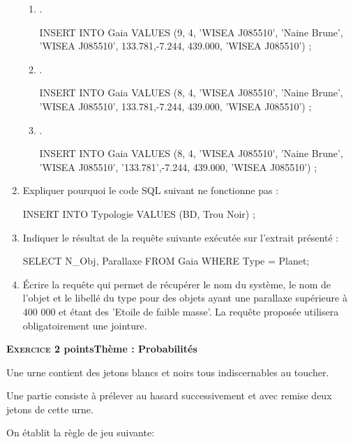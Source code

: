 \documentclass[12pt]{book}
\begin{document}
\begin{enumerate}
\begin{enumerate}
\item .\\
\begin{sql}
INSERT INTO Gaia VALUES (9, 4, 'WISEA J085510', 'Naine Brune', 'WISEA J085510', 133.781,-7.244, 439.000, 'WISEA J085510') ;
\end{sql} 

\item .\\
\begin{sql}
INSERT INTO Gaia VALUES (8, 4, 'WISEA J085510', 'Naine Brune', 'WISEA J085510', 133.781,-7.244, 439.000, 'WISEA J085510') ; 
\end{sql}

\item .\\
\begin{sql}
INSERT INTO Gaia VALUES (8, 4, 'WISEA J085510', 'Naine Brune', 'WISEA J085510', '133.781',-7.244, 439.000, 'WISEA J085510') ;
\end{sql}

	\end{enumerate}
\item Expliquer pourquoi le code SQL suivant ne fonctionne pas : 
\begin{sql}
INSERT INTO Typologie VALUES (BD, Trou Noir) ;
\end{sql}
\item Indiquer le résultat de la requête suivante exécutée sur l’extrait présenté : 
\begin{sql}
SELECT N_Obj, Parallaxe 
FROM Gaia 
WHERE Type = Planet;
\end{sql}
\item Écrire la requête qui permet de récupérer le nom du système, le nom de l’objet et le libellé du type pour des objets ayant une parallaxe supérieure à 400 000 et étant des ’Etoile de faible masse’. La requête proposée utilisera obligatoirement une jointure.
\end{enumerate}

\bigskip


\textbf{\textsc{Exercice 2}  points\hfill Thème : Probabilités}

\medskip

Une urne contient des jetons blancs et noirs tous indiscernables au toucher.

Une partie consiste à prélever au hasard successivement et avec remise deux jetons de cette urne.

On établit la règle de jeu suivante:
\end{document}
